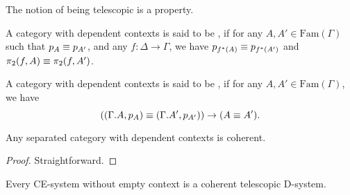 \begin{conj}
The notion of being telescopic is a property.
\end{conj}

\begin{defn}
A category with dependent contexts is said to be , if for any $A,A'\in\mathrm{Fam}(\Gamma)$
such that $p_A\equiv p_{A'}$, and any $f:\Delta\to\Gamma$, we have
$p_{f^\ast(A)}\equiv p_{f^\ast(A')}$ and $\pi_2(f,A)\equiv \pi_2(f,A')$.
\end{defn}

\begin{defn}
A category with dependent contexts is said to be , if for any $A,A'\in\mathrm{Fam}(\Gamma)$, we have
\begin{equation*}
((\ctxext{\Gamma}{A},p_A) \jdeq (\ctxext{\Gamma}{A'},p_{A'}))\to (A\jdeq A').
\end{equation*}
\end{defn}

\begin{lem}
Any separated category with dependent contexts is coherent.
\end{lem}

\begin{proof}
Straightforward.
\end{proof}

\begin{thm}
Every CE-system without empty context is a coherent telescopic D-system.
\end{thm}

